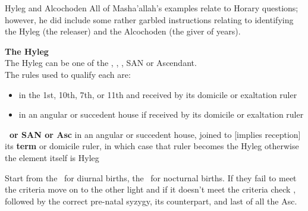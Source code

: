 \begin{frame}[t]{Hyleg and Alcochoden}
All of Masha'allah's examples relate to Horary questions; however, he did include some rather garbled instructions relating to identifying the Hyleg (the releaser) and the Alcochoden (the giver of years).

\textbf{The Hyleg} \\
The Hyleg can be one of the \Sun, \Moon, \Fortune, SAN or Ascendant.\\
The rules used to qualify each are:\footnotemark[1] \\
\begin{itemize}
\item[\Sun] in the 1st, 10th, 7th, or 11th and received by its domicile or exaltation ruler
\item[\Moon] in an angular or succedent house if received by its domicile or exaltation ruler
\end{itemize}

\textbf{\Fortune\ or SAN or Asc} in an angular or succedent house, joined to [implies reception] its \textbf{term} or domicile ruler, in which case that ruler becomes the Hyleg otherwise the element itself is Hyleg

Start from the \Sun\ for diurnal births, the \Moon\ for nocturnal births. If they fail to meet the criteria move on to the other light and if it doesn't meet the criteria check \Fortune, followed by the correct pre-natal syzygy, its counterpart, and last of all the Asc.

\end{frame}
